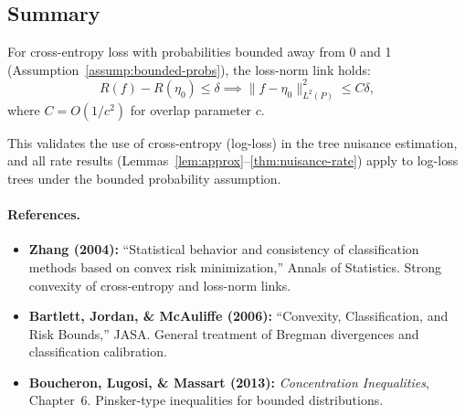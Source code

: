 \subsection{Summary}

For cross-entropy loss with probabilities bounded away from 0 and 1 (Assumption~\ref{assump:bounded-probs}), the loss-norm link holds:
\[
R(f) - R(\eta_0) \le \delta \implies \|f - \eta_0\|_{L^2(P)}^2 \le C\delta,
\]
where $C = O(1/c^2)$ for overlap parameter $c$.

This validates the use of cross-entropy (log-loss) in the tree nuisance estimation, and all rate results (Lemmas~\ref{lem:approx}--\ref{thm:nuisance-rate}) apply to log-loss trees under the bounded probability assumption.

\paragraph{References.}
\begin{itemize}
\item \textbf{Zhang (2004):} ``Statistical behavior and consistency of classification methods based on convex risk minimization,'' Annals of Statistics. Strong convexity of cross-entropy and loss-norm links.
\item \textbf{Bartlett, Jordan, \& McAuliffe (2006):} ``Convexity, Classification, and Risk Bounds,'' JASA. General treatment of Bregman divergences and classification calibration.
\item \textbf{Boucheron, Lugosi, \& Massart (2013):} \emph{Concentration Inequalities}, Chapter~6. Pinsker-type inequalities for bounded distributions.
\end{itemize}
